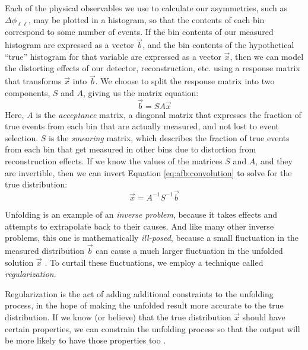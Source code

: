Each of the physical observables we use to calculate our asymmetries,
such as $\Delta \phi_{\ell\ell}$, may be plotted in a histogram, so that
the contents of each bin correspond to some number of
events. If the bin contents of our measured histogram are expressed as a
vector $\vec{b}$, and the bin contents of the hypothetical ``true''
histogram for that variable are expressed as a vector $\vec{x}$, then we can model the
distorting effects of our detector, reconstruction, etc. using a response
matrix that transforms $\vec{x}$ into $\vec{b}$. We choose to split the
response matrix into two components, $S$ and $A$, giving us the matrix equation:
\begin{equation}
\vec{b} = S A \vec{x}
\label{eq:afb:convolution}
\end{equation}
Here, $A$ is the \emph{acceptance} matrix, a diagonal
matrix that expresses the fraction of true events from each bin that
are actually measured, and not lost to event selection. $S$ is the \emph{smearing}
matrix, which describes the fraction of true events from each bin that
get measured in other bins due to distortion from reconstruction
effects. If we know the values of the matrices $S$ and
$A$, and they are invertible, then we can invert Equation
\ref{eq:afb:convolution} to solve for the true distribution:
\begin{equation}
\vec{x} = A^{-1} S^{-1} \vec{b}
\label{eq:afb:deconvolution}
\end{equation}

Unfolding is an example of an \emph{inverse problem}, because it takes
effects and attempts to extrapolate back to their causes. And like
many other inverse problems, this one is mathematically
\emph{ill-posed}, because a small fluctuation in the measured
distribution $\vec{b}$ can cause a much larger fluctuation in the
unfolded solution $\vec{x}$ \cite{blobelseminar}. To curtail these
fluctuations, we employ a technique called \emph{regularization}.

Regularization is the act of adding additional constraints to the
unfolding process, in the hope of making the unfolded result more
accurate to the true distribution. If we know (or believe) that the
true distribution $\vec{x}$ should have certain properties, we can
constrain the unfolding process so that the output will be more likely
to have those properties too \cite{unfoldingcowan}.

